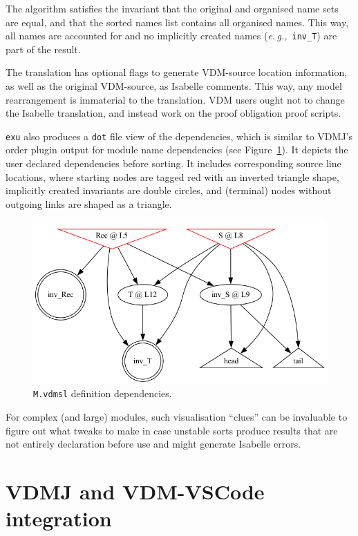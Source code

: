 \documentclass[runningheads,a4paper]{llncs}
\newcommand{\eg}{{\em e.\,g.,\/}}
\begin{document}
The algorithm satisfies the invariant that the original and organised name sets are equal, and that the sorted names list contains all organised names. This way, all names are accounted for and no implicitly created names (\eg~\verb'inv_T') are part of the result. 

The translation has optional flags to generate VDM-source location information, as well as the original VDM-source, as Isabelle comments. This way, any model rearrangement is immaterial to the translation. VDM users ought not to change the Isabelle translation, and instead work on the proof obligation proof scripts.   

\texttt{exu} also produces a \texttt{dot} file view of the dependencies, which is similar to VDMJ's order plugin output for module name dependencies (see Figure~\ref{fig:Mdot}). It depicts the user declared dependencies before sorting. It includes corresponding source line locations, where starting nodes are tagged red with an inverted triangle shape, implicitly created invariants are double circles, and (terminal) nodes without outgoing links are shaped as a triangle.  
%
\begin{figure}[htbp]
    \centering
        \includegraphics[width=\textwidth,scale=0.4]{figures/M.png}
    \caption{\texttt{M.vdmsl} definition dependencies.}\label{fig:Mdot}
 \end{figure}
%
For complex (and large) modules, such visualisation ``clues'' can be invaluable to figure out what tweaks to make in case unstable sorts produce results that are not entirely declaration before use and might generate Isabelle errors. 

\section{VDMJ and VDM-VSCode integration}\label{sec:integration}
\end{document}
